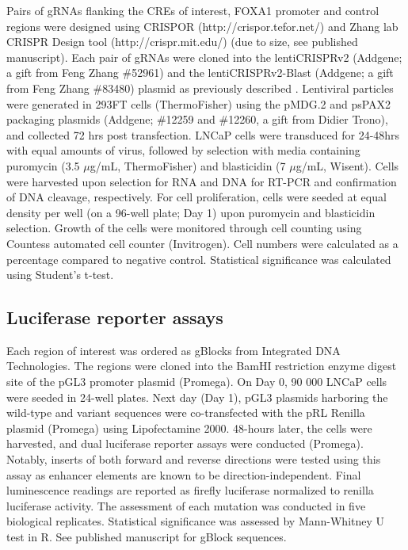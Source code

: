 Pairs of gRNAs flanking the CREs of interest, FOXA1 promoter and control regions were designed using CRISPOR (http://crispor.tefor.net/) and Zhang lab CRISPR Design tool (http://crispr.mit.edu/) (due to size, see published manuscript).
Each pair of gRNAs were cloned into the lentiCRISPRv2 (Addgene; a gift from Feng Zhang \#52961) and the lentiCRISPRv2-Blast (Addgene; a gift from Feng Zhang \#83480) plasmid as previously described \cite{sanjanaImprovedVectorsGenomewide2014}.
Lentiviral particles were generated in 293FT cells (ThermoFisher) using the pMDG.2 and psPAX2 packaging plasmids (Addgene; \#12259 and \#12260, a gift from Didier Trono), and collected 72 hrs post transfection.
LNCaP cells were transduced for 24-48hrs with equal amounts of virus, followed by selection with media containing puromycin (3.5 $\mu$g/mL, ThermoFisher) and blasticidin (7 $\mu$g/mL, Wisent).
Cells were harvested upon selection for RNA and DNA for RT-PCR and confirmation of DNA cleavage, respectively.
For cell proliferation, cells were seeded at equal density per well (on a 96-well plate; Day 1) upon puromycin and blasticidin selection.
Growth of the cells were monitored through cell counting using Countess \texttrademark automated cell counter (Invitrogen).
Cell numbers were calculated as a percentage compared to negative control.
Statistical significance was calculated using Student's t-test.

\subsection{Luciferase reporter assays}

Each region of interest was ordered as gBlocks from Integrated DNA Technologies.
The regions were cloned into the BamHI restriction enzyme digest site of the pGL3 promoter plasmid (Promega).
On Day 0, 90 000 LNCaP cells were seeded in 24-well plates.
Next day (Day 1), pGL3 plasmids harboring the wild-type and variant sequences were co-transfected with the pRL Renilla plasmid (Promega) using Lipofectamine 2000.
48-hours later, the cells were harvested, and dual luciferase reporter assays were conducted (Promega).
Notably, inserts of both forward and reverse directions were tested using this assay as enhancer elements are known to be direction-independent.
Final luminescence readings are reported as firefly luciferase normalized to renilla luciferase activity.
The assessment of each mutation was conducted in five biological replicates.
Statistical significance was assessed by Mann-Whitney U test in R.
See published manuscript for gBlock sequences.

